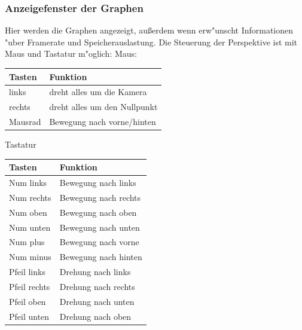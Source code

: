 \documentclass{scrartcl}
\begin{document}
\subsubsection{Anzeigefenster der Graphen}
Hier werden die Graphen angezeigt, außerdem wenn erw"unscht Informationen "uber Framerate und Speicherauslastung. Die Steuerung der Perspektive ist mit Maus und Tastatur m"oglich:\newline
Maus:\newline
\begin{tabular}[b]{|l|l|}
\hline
Tasten &Funktion \\
\hline
links & dreht alles um die Kamera \\
\hline
rechts & dreht alles um den Nullpunkt \\
\hline
Mausrad & Bewegung nach vorne/hinten\\
\hline
\end{tabular}
\newline
Tastatur\newline
\begin{tabular}[b]{|l|l|}
\hline
Tasten &Funktion \\
\hline
Num links & Bewegung nach links \\
\hline
Num rechts & Bewegung nach rechts \\
\hline
Num oben & Bewegung nach oben \\
\hline
Num unten & Bewegung nach unten \\
\hline
Num plus & Bewegung nach vorne\\
\hline
Num minus & Bewegung nach hinten\\
\hline
Pfeil links & Drehung nach links\\
\hline
Pfeil rechts & Drehung nach rechts\\
\hline
Pfeil oben & Drehung nach unten\\
\hline
Pfeil unten & Drehung nach oben\\
\hline
\end{tabular}
\end{document}
